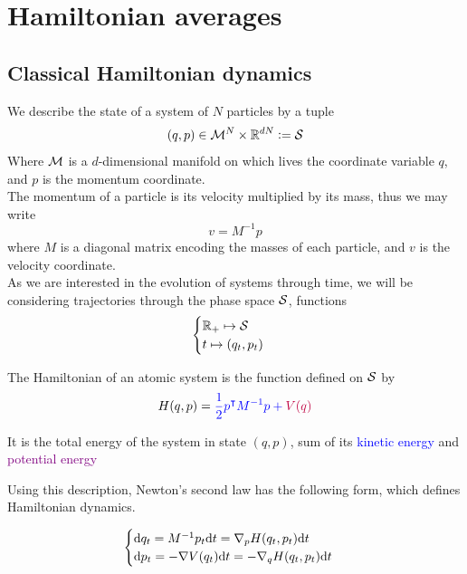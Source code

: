 \section{Hamiltonian averages}
\subsection{Classical Hamiltonian dynamics}


    \begin{definition}
    We describe the state of a system of $N$ particles by a tuple 
    $$(q,p)\in \mathcal{M}^N\times \mathbb{R}^{dN} \mathrel{\mathop:}= \mathcal{S}$$
    Where $\mathcal{M}$ is a $d$-dimensional manifold on which lives the coordinate variable $q$, and $p$ is the momentum coordinate.\\
    The momentum of a particle is its velocity multiplied by its mass, thus we may write 
    $$v=M^{-1}p$$
    where $M$ is a diagonal matrix encoding the masses of each particle, and $v$ is the velocity coordinate.\\
    As we are interested in the evolution of systems through time, we will be considering trajectories through the phase space $\mathcal{S}$, functions
    $$\begin{cases}\mathbb{R}_+\mapsto \mathcal{S}\\
        t\mapsto (q_t,p_t)
    \end{cases}$$
    \end{definition}
        \begin{definition}[Hamiltonian]
            The Hamiltonian of an atomic system is the function defined on $\mathcal{S}$ by\\

            \begin{equation}
                \label{Hamiltonian}
                H(q,p)=\color{blue}{\frac12p^\intercal M^{-1}p}+\color{purple}{V(q)}
            \end{equation}
            
            It is the total energy of the system in state $(q,p)$, sum of its \textcolor{blue}{kinetic energy} and \textcolor{purple}{potential energy}
        \end{definition}

        Using this description, Newton's second law has the following form, which defines Hamiltonian dynamics.

        \begin{equation}
            \label{Hamiltonian dynamics}
            \begin{cases}
                \text d q_t=M^{-1}p_t\text dt=\nabla_p H(q_t,p_t)\text dt\\
                \text d p_t=-\nabla V(q_t)\text dt=-\nabla_q H(q_t,p_t)\text dt
            \end{cases}
        \end{equation}



